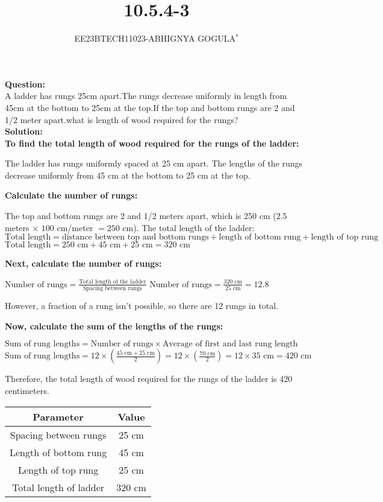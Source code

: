 \documentclass[journal,12pt,twocolumn]{IEEEtran}
\theoremstyle{remark}
\begin{document}

\vspace{3cm}
\title{\textbf{10.5.4-3}}
\author{EE23BTECH11023-ABHIGNYA GOGULA$^{*}$}
\maketitle
\newpage
\bigskip
\renewcommand{\thefigure}{\theenumi}
\renewcommand{\thetable}{\theenumi}
\textbf{Question:}
\\
 A ladder has rungs 25cm apart.The rungs decrease uniformly in length from 45cm at the bottom to 25cm at the top.If the top and bottom rungs are 2 and 1/2 meter apart.what is length of wood required for the rungs?
\\
\textbf{Solution:}
\\
\textbf{To find the total length of wood required for the rungs of the ladder:}

The ladder has rungs uniformly spaced at 25 cm apart. The lengths of the rungs decrease uniformly from 45 cm at the bottom to 25 cm at the top.

\textbf{Calculate the number of rungs:}

The top and bottom rungs are 2 and 1/2 meters apart, which is 250 cm ($2.5$ meters $\times$ $100$ cm/meter $= 250$ cm).
The total length of the ladder: $\text{Total length} = \text{distance between top and bottom rungs} + \text{length of bottom rung} + \text{length of top rung}$
$\text{Total length} = 250 \text{ cm} + 45 \text{ cm} + 25 \text{ cm} = 320 \text{ cm}$

\textbf{Next, calculate the number of rungs:}

$\text{Number of rungs} = \frac{\text{Total length of the ladder}}{\text{Spacing between rungs}}$
$\text{Number of rungs} = \frac{320 \text{ cm}}{25 \text{ cm}} = 12.8$

However, a fraction of a rung isn't possible, so there are 12 rungs in total.

\textbf{Now, calculate the sum of the lengths of the rungs:}

$\text{Sum of rung lengths} = \text{Number of rungs} \times \text{Average of first and last rung length}$
$\text{Sum of rung lengths} = 12 \times \left(\frac{45 \text{ cm} + 25 \text{ cm}}{2}\right) = 12 \times \left(\frac{70 \text{ cm}}{2}\right) = 12 \times 35 \text{ cm} = 420 \text{ cm}$

Therefore, the total length of wood required for the rungs of the ladder is 420 centimeters.

\begin{tabular}{|c|c|}
\hline
\textbf{Parameter} & \textbf{Value} \\
\hline
Spacing between rungs & 25 cm \\
Length of bottom rung & 45 cm \\
Length of top rung & 25 cm \\
Total length of ladder & 320 cm \\
\hline
\end{tabular}


         
\end{document}
